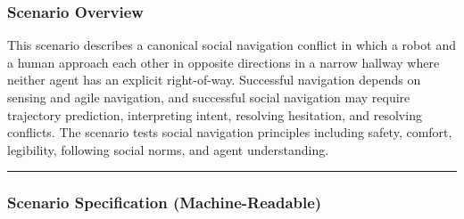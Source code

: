 \documentclass[utf8]{frontiers_suppmat} %
\begin{document}
\subsubsection{Scenario Overview}\label{scenario-overview}

This scenario describes a canonical social navigation conflict in which
a robot and a human approach each other in opposite directions in a
narrow hallway where neither agent has an explicit right-of-way.
Successful navigation depends on sensing and agile navigation, and
successful social navigation may require trajectory prediction,
interpreting intent, resolving hesitation, and resolving conflicts. The
scenario tests social navigation principles including safety, comfort,
legibility, following social norms, and agent understanding.

\begin{center}\rule{0.5\linewidth}{0.5pt}\end{center}

\subsubsection{Scenario Specification
(Machine-Readable)}\label{scenario-specification-machine-readable}
\end{document}
